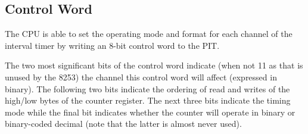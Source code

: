     \subsection{Control Word}
        The CPU is able to set the operating mode and format for each channel of the interval timer by writing an 8-bit control word to the PIT.

        The two most significant bits of the control word indicate (when not 11 as that is unused by the 8253) the channel this control word will affect (expressed in binary). The following two bits indicate the ordering of read and writes of the high/low bytes of the counter register. The next three bits indicate the timing mode while the final bit indicates whether the counter will operate in binary or binary-coded decimal (note that the latter is almost never used).


